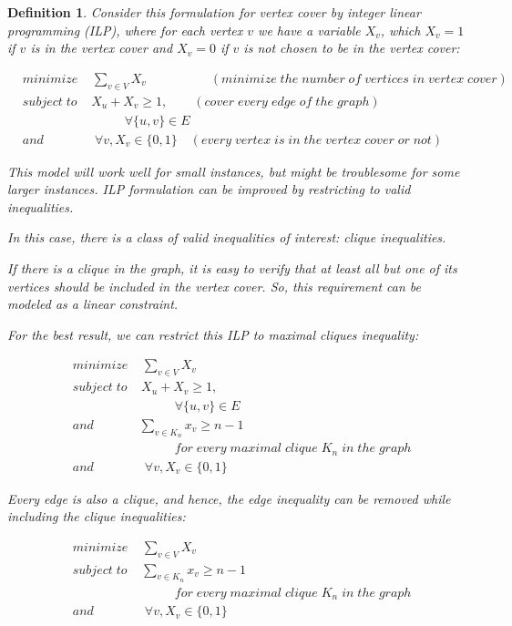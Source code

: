 \documentclass[12pt]{article}
\theoremstyle{slplain}
\newtheorem{defi}{Definition}
\begin{document}
\begin{defi}
Consider this formulation for vertex cover by integer linear programming (ILP), where for each vertex $v$ we have a variable $X_v$, which $X_v = 1$ if $v$ is in the vertex cover and $X_v = 0$ if $v$ is not chosen to be in the vertex cover:

\begin{align*}
&minimize \; \;\; \; \sum_{v\in V}X_v \qquad\qquad\quad (minimize \; the \; number \;  of \;  vertices \; in \; vertex \; cover)\\
&subject\; to \;\;\; \; X_u + X_v  \geq 1 , \qquad (cover \; every \; edge \; of \; the \; graph)\\
&\qquad 	\qquad\qquad\qquad	 \forall \{u,v\} \in E\\
&and	\qquad\qquad	 \forall v, X_v\in \{0,1\} \quad (every \; vertex \; is \; in \; the \; vertex \; cover \; or \; not)
\end{align*}

This model will work well for small instances, but might be troublesome for some larger instances. ILP formulation can be improved  by restricting to valid inequalities.\cite{Gerard2} 

In this case, there is a class of valid inequalities of interest: clique inequalities.

If there is a clique in the graph, it is easy to verify that at least all but one
of its vertices should be included in the vertex cover. So, this requirement can be modeled as a linear constraint.

For the best result, we can restrict this ILP to maximal cliques inequality:


\begin{align*}
&minimize \; \;\; \; \sum_{v\in V}X_v\\
&subject\; to \;\;\; \; X_u + X_v  \geq 1 ,\\
&\qquad 	\qquad\qquad\qquad	 \forall \{u,v\} \in E\\
&and	\qquad\quad\;\; \sum_{v\in K_n}x_v \geq n - 1\\
& \qquad\qquad \qquad\qquad for\; every\; maximal\; clique\; K_n\; in\; the\; graph\\
&and	\qquad\qquad	 \forall v, X_v\in \{0,1\}
\end{align*}

Every edge is also a clique, and hence, the edge inequality can be removed
while including the clique inequalities:


\begin{align*}
&minimize \; \;\; \; \sum_{v\in V}X_v\\
&subject\; to \;\;\; \; \sum_{v\in K_n}x_v \geq n - 1\\
& \qquad\qquad \qquad\qquad for\; every\; maximal\; clique\; K_n\; in\; the\; graph\\
&and	\qquad\qquad	 \forall v, X_v\in \{0,1\}
\end{align*}


\end{defi}
\end{document}
